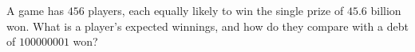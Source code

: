 A game has $456$ players, each equally likely to win the single prize of $45.6$ billion won. What is a player's expected winnings, and how do they compare with a debt of $100000001$ won?
